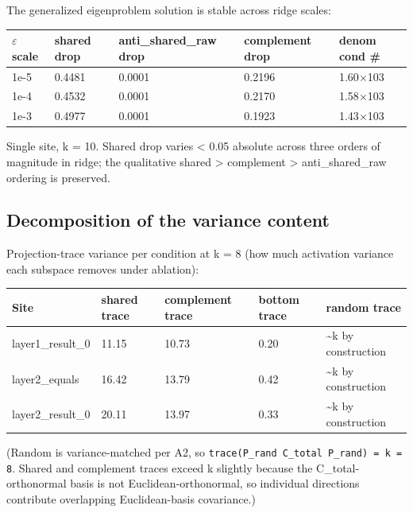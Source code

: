 The generalized eigenproblem solution is stable across ridge scales:

\begin{center}
\begin{tabular}{|l|l|l|l|l|}
\hline
\textbf{$\varepsilon$ scale} & \textbf{shared drop} & \textbf{anti\_shared\_raw drop} & \textbf{complement drop} & \textbf{denom cond \#} \\
\hline
1e-5 & 0.4481 & 0.0001 & 0.2196 & 1.60$\times$103 \\
1e-4 & 0.4532 & 0.0001 & 0.2170 & 1.58$\times$103 \\
1e-3 & 0.4977 & 0.0001 & 0.1923 & 1.43$\times$103 \\
\hline
\end{tabular}
\end{center}


Single site, k = 10. Shared drop varies < 0.05 absolute across three
orders of magnitude in ridge; the qualitative shared > complement >
anti\_shared\_raw ordering is preserved.

\subsection{Decomposition of the variance content}

Projection-trace variance per condition at k = 8 (how much activation
variance each subspace removes under ablation):

\begin{center}
\begin{tabular}{|l|l|l|l|l|}
\hline
\textbf{Site} & \textbf{shared trace} & \textbf{complement trace} & \textbf{bottom trace} & \textbf{random trace} \\
\hline
layer1\_result\_0 & 11.15 & 10.73 & 0.20 & \textasciitilde{}k by construction \\
layer2\_equals & 16.42 & 13.79 & 0.42 & \textasciitilde{}k by construction \\
layer2\_result\_0 & 20.11 & 13.97 & 0.33 & \textasciitilde{}k by construction \\
\hline
\end{tabular}
\end{center}


(Random is variance-matched per A2, so \texttt{trace(P\_rand C\_total P\_rand) = k = 8}.
Shared and complement traces exceed k slightly because the C\_total-
orthonormal basis is not Euclidean-orthonormal, so individual directions
contribute overlapping Euclidean-basis covariance.)

